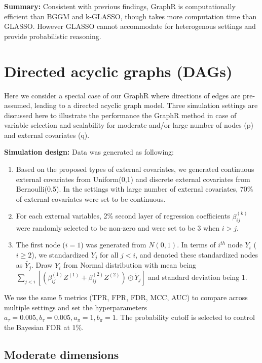 \documentclass[
]{book}
\begin{document}
\textbf{Summary:} Consistent with previous findings, GraphR is computationally efficient than BGGM and k-GLASSO, though takes more computation time than GLASSO. However GLASSO cannot accommodate for heterogenous settings and provide probabilistic reasoning.

\hypertarget{dir}{%
\section{Directed acyclic graphs (DAGs)}\label{dir}}

Here we consider a special case of our GraphR where directions of edges are pre-assumed, leading to a directed acyclic graph model. Three simulation settings are discussed here to illustrate the performance the GraphR method in case of variable selection and scalability for moderate and/or large number of nodes (p) and external covariates (q).

\textbf{Simulation design:}
Data was generated as following:

\begin{enumerate}
\def\labelenumi{(\arabic{enumi})}
\item
  Based on the proposed types of external covariates, we generated continuous external covariates from Uniform(0,1) and discrete external covariates from Bernoulli(0.5). In the settings with large number of external covariates, 70\% of external covariates were set to be continuous.
\item
  For each external variables, 2\% second layer of regression coefficients \(\beta_{ij}^{(k)}\) were randomly selected to be non-zero and were set to be 3 when \(i > j\).
\item
  The first node (\(i=1\)) was generated from \(N(0,1)\). In terms of \(i^{th}\) node \(Y_i\) (\(i \geq 2\)), we standardized \(Y_j\) for all \(j < i\), and denoted these standardized nodes as \(\tilde{Y_j}\). Draw \(Y_i\) from Normal distribution with mean being \(\sum_{j<i}\left[(\beta_{ij}^{(1)}Z^{(1)} + \beta_{ij}^{(2)}Z^{(2)}) \odot \tilde{Y_j} \right]\) and standard deviation being 1.
\end{enumerate}

We use the same 5 metrics (TPR, FPR, FDR, MCC, AUC) to compare across multiple settings and set the hyperparameters \(a_\tau = 0.005, b_\tau = 0.005, a_\pi = 1, b_\pi =1\). The probability cutoff is selected to control the Bayesian FDR at 1\%.

\hypertarget{moderate}{%
\subsection{Moderate dimensions}\label{moderate}}
\end{document}
